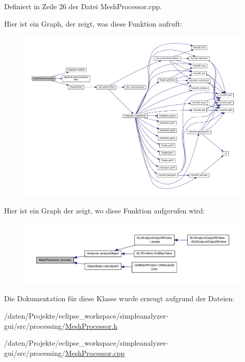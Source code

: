 Definiert in Zeile 26 der Datei Mesh\-Processor.\-cpp.



Hier ist ein Graph, der zeigt, was diese Funktion aufruft\-:\nopagebreak
\begin{figure}[H]
\begin{center}
\leavevmode
\includegraphics[width=350pt]{classMeshProcessor_a060c3815db33f8e52ac620ed2239ccc9_cgraph}
\end{center}
\end{figure}




Hier ist ein Graph der zeigt, wo diese Funktion aufgerufen wird\-:\nopagebreak
\begin{figure}[H]
\begin{center}
\leavevmode
\includegraphics[width=350pt]{classMeshProcessor_a060c3815db33f8e52ac620ed2239ccc9_icgraph}
\end{center}
\end{figure}




Die Dokumentation für diese Klasse wurde erzeugt aufgrund der Dateien\-:\begin{DoxyCompactItemize}
\item 
/daten/\-Projekte/eclipse\-\_\-workspace/simpleanalyzer-\/gui/src/processing/\hyperlink{MeshProcessor_8h}{Mesh\-Processor.\-h}\item 
/daten/\-Projekte/eclipse\-\_\-workspace/simpleanalyzer-\/gui/src/processing/\hyperlink{MeshProcessor_8cpp}{Mesh\-Processor.\-cpp}\end{DoxyCompactItemize}

